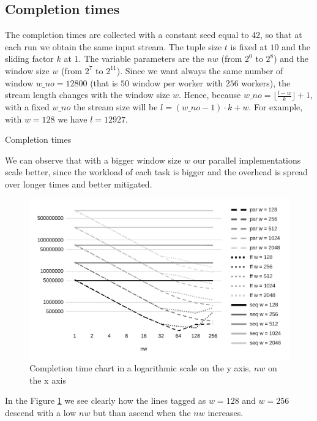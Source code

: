 \subsection{Completion times}
The completion times are collected with a constant seed equal to $42$, so that at each run we obtain the same input stream. The tuple size $t$ is fixed at $10$ and the sliding factor $k$ at $1$. The variable parameters are the $nw$ (from $2^0$ to $2^8$) and the window size $w$ (from $2^7$ to $2^{11}$). Since we want always the same number of window $w\_no = 12800$ (that is $50$ window per worker with $256$ workers), the stream length changes with the window size $w$. Hence, because $w\_no = \lfloor\frac{l-w}{k}\rfloor+1$, with a fixed $w\_no$ the stream size will be $l = (w\_no - 1) \cdot k + w$. For example, with $w = 128$ we have $l = 12927$.

\begin{table}[H]
    \centering
    
    \caption{Completion times}
    \label{tab:time_table}
\end{table}

\noindent
We can observe that with a bigger window size $w$ our parallel implementations scale better, since the workload of each task is bigger and the overhead is spread over longer times and better mitigated.

\begin{figure}[H]
    \centering
    \includegraphics[width=.8\linewidth]{assets/completion_time}
    \caption{Completion time chart in a logarithmic scale on the y axis, $nw$ on the x axis}
    \label{fig:completion_time}
\end{figure}

\noindent
In the Figure \ref{fig:completion_time} we see clearly how the lines tagged as $w = 128$ and $w = 256$ descend with a low $nw$ but than ascend when the $nw$ increases.

